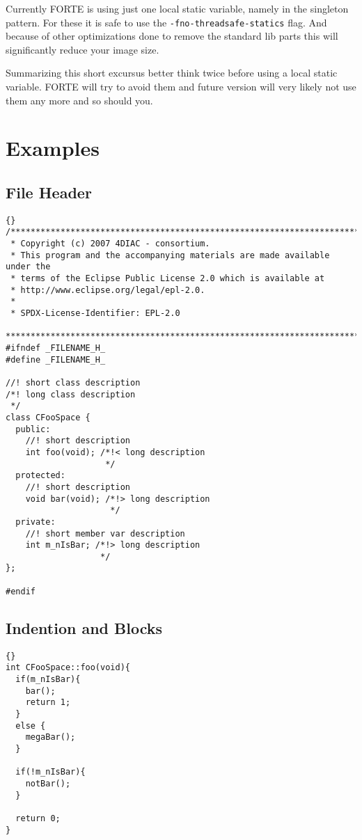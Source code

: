 \documentclass[final,a4paper,10pt, oneside]{article}
\begin{document}
Currently FORTE is using just one local static variable, namely in the singleton pattern. For these it is safe to use the \verb=-fno-threadsafe-statics= flag. And because of other optimizations done to remove the standard lib parts this will significantly reduce your image size. 

Summarizing this short excursus better think twice before using a local static variable. FORTE will try to avoid them and future version will very likely not use them any more and so should you.


\appendix
\section{Examples}
\subsection{File Header} \label{subsec:FileHeader}

\begin{lstlisting}[frame=trbl]{}
/*******************************************************************************
 * Copyright (c) 2007 4DIAC - consortium.
 * This program and the accompanying materials are made available under the
 * terms of the Eclipse Public License 2.0 which is available at
 * http://www.eclipse.org/legal/epl-2.0.
 *
 * SPDX-License-Identifier: EPL-2.0
 *******************************************************************************
#ifndef _FILENAME_H_  
#define _FILENAME_H_  

//! short class description
/*! long class description
 */
class CFooSpace {
  public:
    //! short description
    int foo(void); /*!< long description
                    */   
  protected:
    //! short description
    void bar(void); /*!> long description
                     */
  private:
    //! short member var description
    int m_nIsBar; /*!> long description
                   */  
};

#endif
\end{lstlisting}

\newpage
\subsection{Indention and Blocks} \label{subsec:IndentionAndBlocks}
\begin{lstlisting}[frame=trbl]{}
int CFooSpace::foo(void){
  if(m_nIsBar){
    bar();
    return 1;
  }
  else {
    megaBar();
  }
    
  if(!m_nIsBar){
  	notBar();  
  }
  
  return 0;
}
\end{lstlisting}
\end{document}
